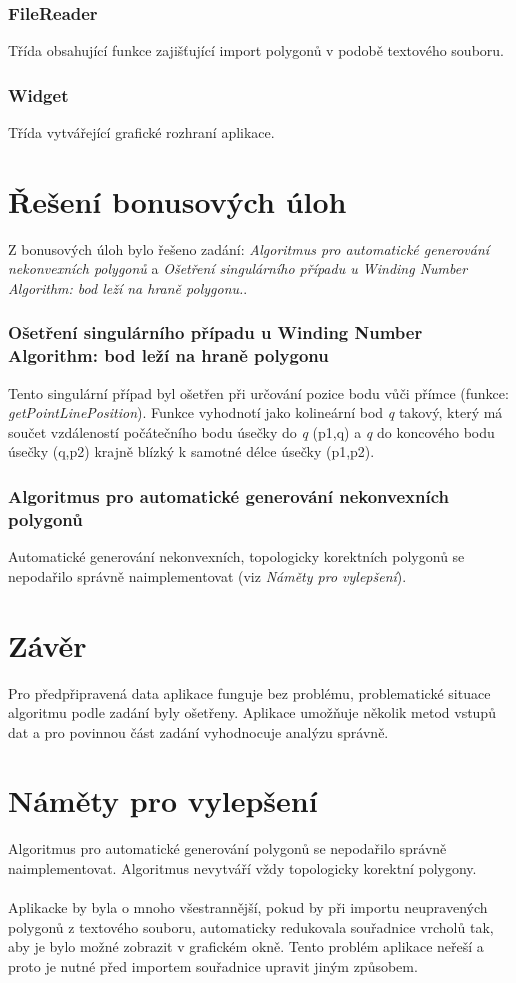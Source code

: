 \documentclass[a4paper, 12pt]{article}
\begin{document}
\subsubsection{FileReader}
Třída obsahující funkce zajišťující import polygonů v podobě textového souboru.

\subsubsection{Widget}
Třída vytvářející grafické rozhraní aplikace.

\section{Řešení bonusových úloh}
Z bonusových úloh bylo řešeno zadání: \textit{Algoritmus pro automatické generování nekonvexních polygonů} a \textit{Ošetření singulárního případu u Winding Number Algorithm: bod leží na hraně polygonu.}.

\subsubsection{Ošetření singulárního případu u Winding Number Algorithm: bod leží na hraně polygonu}
Tento singulární případ byl ošetřen při určování pozice bodu vůči přímce (funkce: \textit{getPointLinePosition}). Funkce vyhodnotí jako kolineární bod \textit{q}  takový, který má součet vzdáleností počátečního bodu úsečky do \textit{q} (p1,q) a \textit{q} do koncového bodu úsečky (q,p2) krajně blízký k samotné délce úsečky (p1,p2).

\subsubsection{Algoritmus pro automatické generování nekonvexních polygonů}
Automatické generování nekonvexních, topologicky korektních polygonů se nepodařilo správně naimplementovat (viz \textit{Náměty pro vylepšení}). 

\section{Závěr}
Pro předpřipravená data aplikace funguje bez problému, problematické situace algoritmu podle
zadání byly ošetřeny. Aplikace umožňuje několik metod vstupů dat a pro povinnou část zadání vyhodnocuje analýzu správně.

\section{Náměty pro vylepšení} 
Algoritmus pro automatické generování polygonů se nepodařilo správně naimplementovat. Algoritmus nevytváří vždy topologicky korektní polygony.\\
\\
Aplikacke by byla o mnoho všestrannější, pokud by při importu neupravených polygonů z textového souboru, automaticky redukovala souřadnice vrcholů tak, aby je bylo možné zobrazit v grafickém okně. Tento problém aplikace neřeší a proto je nutné před importem souřadnice upravit jiným způsobem.
\end{document}
